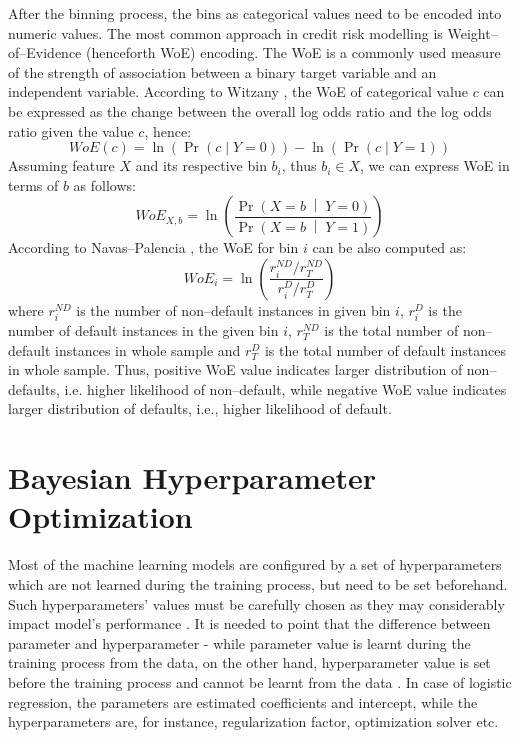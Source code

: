 After the binning process, the bins as categorical values need to be encoded into numeric values. The most common approach in credit risk modelling is Weight--of--Evidence (henceforth WoE) encoding. The WoE is a commonly used measure of the strength of association between a binary target variable and an independent variable.
According to Witzany \citep{witzany2017credit}, the WoE of categorical value $c$ can be expressed as the change between the overall log odds ratio and the log odds ratio given the value $c$, hence:
\begin{equation}\label{eq}
    WoE\left(c\right) = \ln\left(\operatorname{Pr}\left(c \mid Y = 0 \right) \right) - \ln\left(\operatorname{Pr}\left(c \mid Y = 1 \right) \right)
\end{equation}
Assuming feature $X$ and its respective bin $b_i$, thus $b_i \in X$, we can express WoE in terms of $b$ as follows:
\begin{equation}\label{eq}
    WoE_{X, b}= \ln \left(\frac{\Pr{\left(X = b\;\middle|\;Y = 0\right)}}{\Pr{\left(X = b\;\middle|\;Y = 1\right)}}\right)
\end{equation}
According to Navas--Palencia \citep{navas2020optimal}, the WoE for bin $i$ can be also computed as:
\begin{equation}\label{eq}
    WoE_{i} = \ln \left( \frac{r^{ND}_i / r^{ND}_T} {r^{D}_i / r^{D}_T}  \right)
\end{equation}
where $r^{ND}_i$ is the number of non--default instances in given bin $i$, $r^{D}_i$ is the number of default instances in the given bin $i$, $r^{ND}_T$ is the total number of non--default instances in whole sample and $r^{D}_T$ is the total number of default instances in whole sample.
Thus, positive WoE value indicates larger distribution of non--defaults, i.e. higher likelihood of non--default, while negative WoE value indicates larger distribution of defaults, i.e., higher likelihood of default.

\newpage
\section{Bayesian Hyperparameter Optimization}
\label{sec:bayesoptheory}
Most of the machine learning models are configured by a set of hyperparameters which are not learned during the training process, but need to be set beforehand. Such hyperparameters' values must be carefully chosen as they may considerably impact model's performance \citep{bischl2023hyperparameter}.
It is needed to point that the difference between parameter and hyperparameter - while parameter value is learnt during the training process from the data, on the other hand, hyperparameter value is set before the training process and cannot be learnt from the data \citep{owen2022hyperparameter}. In case of logistic regression, the parameters are estimated coefficients and intercept, while the hyperparameters are, for instance, regularization factor, optimization solver etc.

